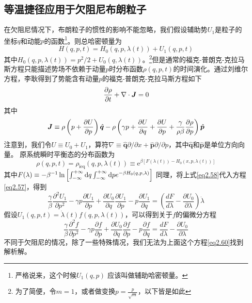 \subsection{等温捷径应用于欠阻尼布朗粒子}
\qquad 在欠阻尼情况下，布朗粒子的惯性的影响不能忽略，我们假设辅助势$U_1$是粒子的坐标$q$和动能$p$的函数\footnote{严格说来，这个时候$U_1 (q,p)$ 应该叫做辅助哈密顿量。}。则总哈密顿量为
\begin{equation}
    H(q, p, t)=H_{0}(q, p, \lambda(t))+U_{1}(q, p, t)
    \label{eq2.56}
\end{equation}
其中$H_{0}(q, p, \lambda(t))=p^{2}/{2}+U_{0}(q, \lambda(t))$。\footnote{为了简便，令$m=1$，或者做变换$p=\frac{p}{\sqrt{m}}，以下皆是如此$}但是通常的福克-普朗克-克拉马斯方程只能描述势场不依赖于动量$p$时分布函数$\rho (q,p,t)$的时间演化。通过刘维尔方程，李耿\cite{Li2016}得到了势能含有动量$p$的福克-普朗克-克拉马斯方程如下
\begin{equation}
        \frac{\partial \rho}{\partial t} + \nabla \cdot \bm{J} = 0
    \label{eq2.57}
\end{equation}
其中
\begin{equation}
    \bm{J} \equiv \rho \left( p + \frac{\partial U}{\partial p} \right) \hat{\bm{q}}-\rho\left(\gamma p+\frac{\partial U}{\partial q}+ \frac{\partial U}{\partial p} + \frac{\gamma}{\rho \beta} \frac{\partial \rho}{\partial p}\right) \hat{\bm{p}}
\label{eq2.57.5}
\end{equation}
注意到，我们令$U \equiv U_0 + U_1$，算符$\nabla \equiv \hat{\bm{q}} \partial / \partial x+\hat{\bm{p}} \partial / \partial p$，其中$\hat{\bm{q}}$和$\hat{\bm{p}}$是单位方向向量。
原系统瞬时平衡态的分布函数为
\begin{equation}
    \rho(q, p, t)=\rho_{\mathrm{ieq}}(q, p, \lambda(t)) \equiv \mathrm{e}^{\beta\left[F(\lambda(t))-H_{0}(x, p, \lambda(t))\right]}
    \label{eq2.58}
\end{equation}
其中$F(\lambda) \equiv-\beta^{-1} \ln \left[\int_{-\infty}^{+\infty} \mathrm{d} q \int_{-\infty}^{+\infty} \mathrm{d} p e^{-\beta H_{0}(q, p, \lambda)}\right]$
同理，将上式\eqref{eq2.58}代入方程\eqref{eq2.57}，得到
\begin{equation}
    \frac{\gamma}{\beta} \frac{\partial^{2} U_{1}}{\partial p^{2}}-\gamma p \frac{\partial U_{1}}{\partial p}+\frac{\partial U_{0}}{\partial q} \frac{\partial U_{1}}{\partial p}-p \frac{\partial U_{1}}{\partial q}=\left(\frac{d F}{d \lambda}-\frac{\partial U_{0}}{\partial \lambda}\right) \dot{\lambda}
    \label{eq2.59}
\end{equation}
假设$U_{1}(q, p, t)=\dot{\lambda}(t) f(q, p, \lambda(t))$，可以得到关于$f$的偏微分方程
\begin{equation}
    \frac{\gamma}{\beta} \frac{\partial^{2} f}{\partial p^{2}}-\gamma p \frac{\partial f}{\partial p}+\frac{\partial U_{0}}{\partial q} \frac{\partial f}{\partial p}-p \frac{\partial f}{\partial q}=\frac{d F}{d \lambda}-\frac{\partial U_{0}}{\partial \lambda}
    \label{eq2.60}
\end{equation}
不同于欠阻尼的情况，除了一些特殊情况，我们无法为上面这个方程\eqref{eq2.60}找到解析解。

